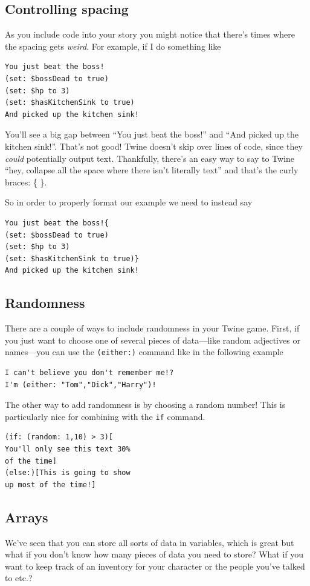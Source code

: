 \documentclass[a5paper,11pt]{article}
\begin{document}
\subsection{Controlling spacing}
As you include code into your story you might notice that there's times where the spacing gets \emph{weird}. For example, if I do something like

\begin{verbatim}
You just beat the boss!
(set: $bossDead to true)
(set: $hp to 3)
(set: $hasKitchenSink to true)
And picked up the kitchen sink!
\end{verbatim}

You'll see a big gap between ``You just beat the boss!'' and ``And picked up the kitchen sink!''. That's not good! Twine doesn't skip over lines of code, since they \emph{could} potentially output text. Thankfully, there's an easy way to say to Twine ``hey, collapse all the space where there isn't literally text'' and that's the curly braces: \{ \}.

So in order to properly format our example we need to instead say
\begin{verbatim}
You just beat the boss!{
(set: $bossDead to true)
(set: $hp to 3)
(set: $hasKitchenSink to true)}
And picked up the kitchen sink!
\end{verbatim}

\subsection{Randomness}
There are a couple of ways to include randomness in your Twine game. First, if you just want to choose one of several pieces of data---like random adjectives or names---you can use the \verb|(either:)| command like in the following example
\begin{verbatim}
I can't believe you don't remember me!? 
I'm (either: "Tom","Dick","Harry")!
\end{verbatim}

The other way to add randomness is by choosing a random number! This is particularly nice for combining with the \verb|if| command.

\begin{verbatim}
(if: (random: 1,10) > 3)[
You'll only see this text 30%
of the time]
(else:)[This is going to show
up most of the time!]
\end{verbatim}

\subsection{Arrays}
We've seen that you can store all sorts of data in variables, which is great but what if you don't know how many pieces of data you need to store? What if you want to keep track of an inventory for your character or the people you've talked to etc.?
\end{document}
